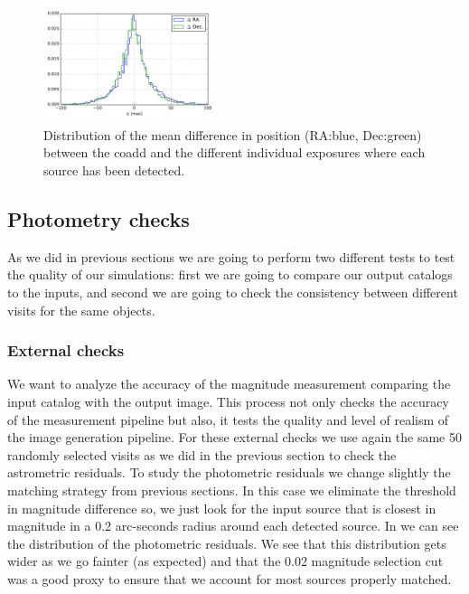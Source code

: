 \documentclass[\docopts]{\docclass}
\begin{document}
\begin{figure}
  \centering
  \includegraphics[width=0.45\textwidth]{astrometry_internal_10visits_imsim_undithered}
  \caption{Distribution of the mean difference in position (RA:blue, Dec:green) between the coadd and the different individual exposures
  where each source has been detected.}
  \label{fig:astrometry_internal}
\end{figure}

\subsection{Photometry checks}
\label{sec:photometry_checks}

As we did in previous sections we are going to perform two different tests to test the quality of our simulations: first we are going to
compare our output catalogs to the inputs, and second we are going to check the consistency between different visits for the same objects.

\subsubsection{External checks}
\label{sec:external_photometry}

We want to analyze the accuracy of the magnitude measurement comparing the input catalog with the output image. This process not only checks
the accuracy of the measurement pipeline but also, it tests the quality and level of realism of the image generation pipeline.
For these external checks we use again the same 50 randomly selected visits as we did in the previous section to check the astrometric residuals.
To study the photometric residuals we change slightly the matching strategy from previous sections. In this case we eliminate the threshold
in magnitude difference so, we just look for the input source that is closest in magnitude in a 0.2 arc-seconds radius around each detected
source. In  we can see the distribution of the photometric residuals. We see that this distribution gets wider as we go
fainter (as expected) and that the 0.02 magnitude selection cut was a good proxy to ensure that we account for most sources properly matched.
\end{document}
